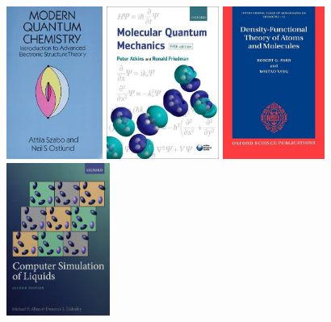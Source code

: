 {\begin{figure}[H]
    \begin{center}
        \includegraphics[height=5cm]{fig/modern-qm.jpg} 
        \hspace{0.5em}
        \includegraphics[height=5cm]{fig/mol-quan-mech.jpeg} 
        \hspace{0.5em}
        \includegraphics[height=5cm]{fig/dft-atom-mol.jpg} \\
        \vspace{1em}
        \includegraphics[height=5cm]{fig/com-sim-liq.jpg} 

\end{center}
\end{figure}}
